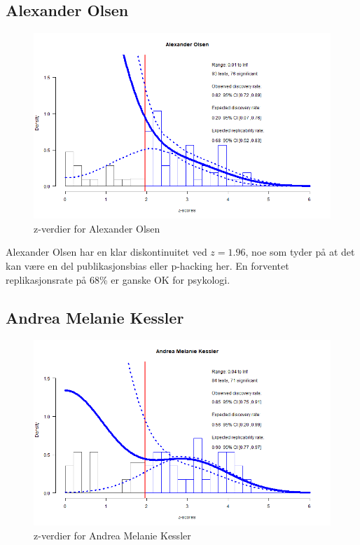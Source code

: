 \documentclass[doc,norsk]{apa7}
\begin{document}
\subsection{Alexander Olsen}
\begin{figure}[h!]
    \centering
    \includegraphics[width=\textwidth]{images/Alexander Olsen.png}
    \caption{z-verdier for Alexander Olsen}
\end{figure}

Alexander Olsen har en klar diskontinuitet ved $z=1.96$, noe som tyder på at det kan være en del publikasjonsbias eller p-hacking her. En forventet replikasjonsrate på 68\% er ganske OK for psykologi.

\subsection{Andrea Melanie Kessler}
\begin{figure}[h!]
    \centering
    \includegraphics[width=\textwidth]{images/Andrea Melanie Kessler.png}
    \caption{z-verdier for Andrea Melanie Kessler}
\end{figure}
\end{document}
